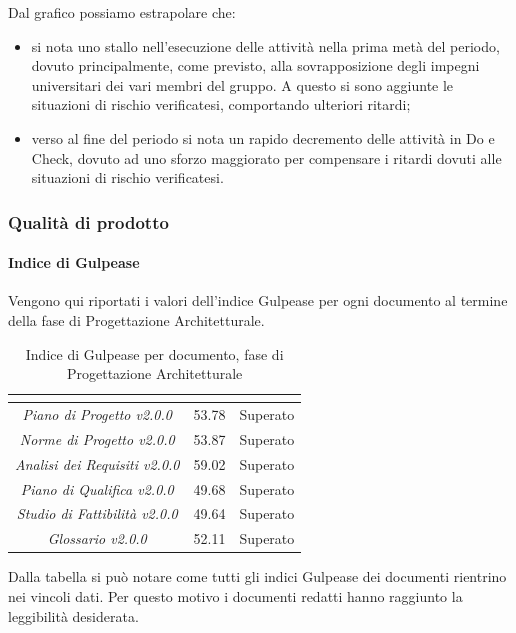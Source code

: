 Dal grafico possiamo estrapolare che:
\begin{itemize}
	\item si nota uno stallo nell'esecuzione delle attività nella prima metà del periodo, dovuto principalmente, come previsto, alla sovrapposizione degli impegni universitari dei vari membri del gruppo. A questo si sono aggiunte le situazioni di rischio verificatesi, comportando ulteriori ritardi;
	\item verso al fine del periodo si nota un rapido decremento delle attività in Do e Check, dovuto ad uno sforzo maggiorato per compensare i ritardi dovuti alle situazioni di rischio verificatesi.
\end{itemize}
\subsubsection{Qualità di prodotto}
\paragraph{Indice di Gulpease} \Spazio
Vengono qui riportati i valori dell'indice Gulpease per ogni documento al termine della fase di Progettazione Architetturale.
\renewcommand{\arraystretch}{1.5}
\begin{table}[H]
	\begin{center}
		\begin{tabular}{|c|c|c|}
			\hline
			\rowcolor{title_row}
			\textbf{\color{title_text}{Documento}} & \textbf{\color{title_text}{Valore indice}} & \textbf{\color{title_text}{Esito}} \\
			\hline
			\emph{Piano di Progetto v2.0.0} & {53.78} & {Superato}\\
			\hline
			\emph{Norme di Progetto v2.0.0} & {53.87} & {Superato}\\
			\hline
			\emph{Analisi dei Requisiti v2.0.0} & {59.02} & {Superato}\\
			\hline
			\emph{Piano di Qualifica v2.0.0} & {49.68} & {Superato}\\
			\hline
			\emph{Studio di Fattibilità v2.0.0} & {49.64} & {Superato}\\
			\hline
			\emph{Glossario v2.0.0} & {52.11} & {Superato}\\
			\hline
		\end{tabular}
		\caption[Esiti verifica documenti, Consolidamento e Progettazione Architetturale]{Indice di Gulpease per documento, fase di Progettazione Architetturale}
		\label{tabella:verifica documenti rp}
	\end{center}
\end{table}
\renewcommand{\arraystretch}{1}
Dalla tabella si può notare come tutti gli indici Gulpease dei documenti rientrino nei vincoli dati. Per questo motivo i documenti redatti hanno raggiunto la leggibilità desiderata.


